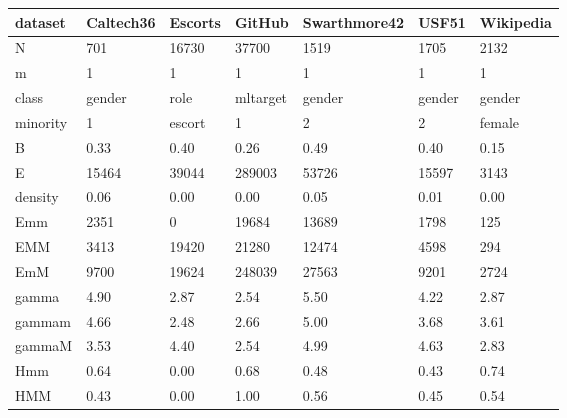 \begin{tabular}{lllllll}
\toprule
dataset & Caltech36 & Escorts &    GitHub & Swarthmore42 &   USF51 & Wikipedia \\
\midrule
N        &       701 &   16730 &     37700 &         1519 &    1705 &      2132 \\
m        &         1 &       1 &         1 &            1 &       1 &         1 \\
class    &    gender &    role &  mltarget &       gender &  gender &    gender \\
minority &         1 &  escort &         1 &            2 &       2 &    female \\
B        &      0.33 &    0.40 &      0.26 &         0.49 &    0.40 &      0.15 \\
E        &     15464 &   39044 &    289003 &        53726 &   15597 &      3143 \\
density  &      0.06 &    0.00 &      0.00 &         0.05 &    0.01 &      0.00 \\
Emm      &      2351 &       0 &     19684 &        13689 &    1798 &       125 \\
EMM      &      3413 &   19420 &     21280 &        12474 &    4598 &       294 \\
EmM      &      9700 &   19624 &    248039 &        27563 &    9201 &      2724 \\
gamma    &      4.90 &    2.87 &      2.54 &         5.50 &    4.22 &      2.87 \\
gammam   &      4.66 &    2.48 &      2.66 &         5.00 &    3.68 &      3.61 \\
gammaM   &      3.53 &    4.40 &      2.54 &         4.99 &    4.63 &      2.83 \\
Hmm      &      0.64 &    0.00 &      0.68 &         0.48 &    0.43 &      0.74 \\
HMM      &      0.43 &    0.00 &      1.00 &         0.56 &    0.45 &      0.54 \\
\bottomrule
\end{tabular}
